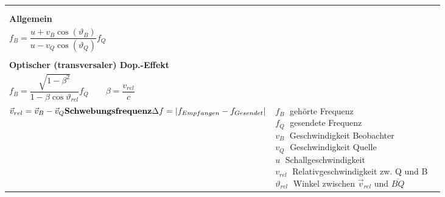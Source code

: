 \begin{tabular}{|l|l|l|}
\begin{minipage}[]{7cm}
	  	$f_B = \left(1 + \dfrac{v_B}{u} \cos(\vartheta_B)\right) f_Q$ \\
	  	\vspace{.5cm}\\
	  	\textbf{Allgemein} \\
	  	$f_B = \dfrac{u + v_B \cos(\vartheta_B)}{u - v_Q \cos(\vartheta_Q)} f_Q$ \\
	  	\vspace{.5cm}\\
	  	\textbf{Optischer (transversaler) Dop.-Effekt } \\
	  	$f_B = \dfrac{\sqrt{1 - \beta^2}}{1 - \beta \cos \vartheta_{rel}} f_Q \qquad \beta =
	  	\dfrac{v_{rel}}{c}$ \\ 
	  	$ \vec{v}_{rel} = \vec{v}_B - \vec{v}_Q \vspace{.5cm}\\
	  	\textbf{Schwebungsfrequenz}\\
	  	\Delta f = |f_{Empfangen} - f_{Gesendet}|$ \vspace{.2cm}
      	\renewcommand{\arraystretch}{1}
    	\end{minipage}
	& \parbox{6.5cm}{
		$f_B \;$ gehörte Frequenz \\
		$f_Q \;$ gesendete Frequenz \\
		$v_B \;$ Geschwindigkeit Beobachter \\
		$v_Q \;$ Geschwindigkeit Quelle\\
		$u \;$ Schallgeschwindigkeit\\
		$v_{rel} \;$ Relativgeschwindigkeit zw. Q und B\\
		$\vartheta_{rel} \;$ Winkel zwischen $\vec{v}_{rel}$ und $\overline{BQ}$
		} \\
\hline
\end{tabular}

